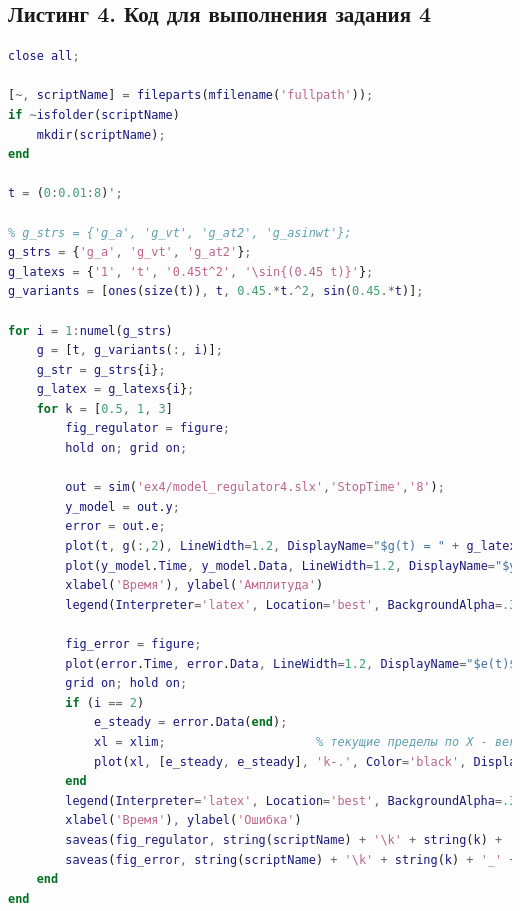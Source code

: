 \documentclass[a4paper]{article}
\begin{document}
\subsection*{Листинг 4. Код для выполнения задания 4}
\begin{lstlisting}[caption={Код для построения графиков для задания 4}, language=matlab]
% clear all;
close all;

[~, scriptName] = fileparts(mfilename('fullpath'));
if ~isfolder(scriptName)
    mkdir(scriptName);
end

t = (0:0.01:8)';

% g_strs = {'g_a', 'g_vt', 'g_at2', 'g_asinwt'};
g_strs = {'g_a', 'g_vt', 'g_at2'};
g_latexs = {'1', 't', '0.45t^2', '\sin{(0.45 t)}'};
g_variants = [ones(size(t)), t, 0.45.*t.^2, sin(0.45.*t)];

for i = 1:numel(g_strs)
    g = [t, g_variants(:, i)];
    g_str = g_strs{i};
    g_latex = g_latexs{i};
    for k = [0.5, 1, 3]
        fig_regulator = figure;
        hold on; grid on;

        out = sim('ex4/model_regulator4.slx','StopTime','8');
        y_model = out.y;
        error = out.e;
        plot(t, g(:,2), LineWidth=1.2, DisplayName="$g(t) = " + g_latex + "$")
        plot(y_model.Time, y_model.Data, LineWidth=1.2, DisplayName="$y_{zamk}(t), k = " + string(k) + "$")
        xlabel('Время'), ylabel('Амплитуда')
        legend(Interpreter='latex', Location='best', BackgroundAlpha=.3, FontSize=12, FontName='Computer Modern')

        fig_error = figure;
        plot(error.Time, error.Data, LineWidth=1.2, DisplayName="$e(t)$")
        grid on; hold on;
        if (i == 2)
            e_steady = error.Data(end);
            xl = xlim;                     % текущие пределы по X - вектор [x_min, x_max]
            plot(xl, [e_steady, e_steady], 'k-.', Color='black', DisplayName="$e_{end} = " + string(e_steady) + "$");     % два значения y0 для двух точек
        end
        legend(Interpreter='latex', Location='best', BackgroundAlpha=.3, FontSize=12, FontName='Computer Modern')
        xlabel('Время'), ylabel('Ошибка')
        saveas(fig_regulator, string(scriptName) + '\k' + string(k) + '_' + g_str + '.eps', 'epsc')
        saveas(fig_error, string(scriptName) + '\k' + string(k) + '_' + g_str + '_error.eps', 'epsc')
    end
end
\end{lstlisting}
\end{document}
